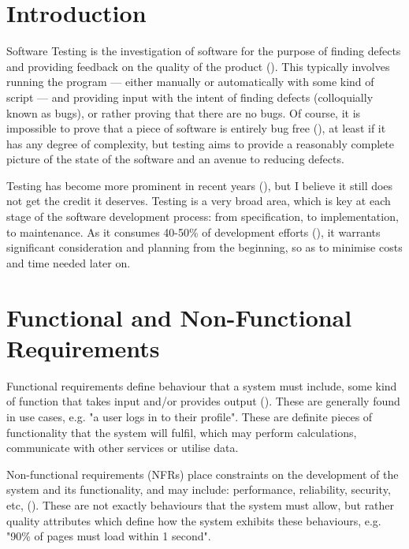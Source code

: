 \documentclass[12pt]{article}
\begin{document}
\pagebreak


\tableofcontents
\pagebreak



\section{Introduction}

Software Testing is the investigation of software for the purpose of finding defects and providing feedback on the quality of the product (). This typically involves running the program --- either manually or automatically with some kind of script --- and providing input with the intent of finding defects (colloquially known as bugs), or rather proving that there are no bugs. Of course, it is impossible to prove that a piece of software is entirely bug free (), at least if it has any degree of complexity, but testing aims to provide a reasonably complete picture of the state of the software and an avenue to reducing defects.

Testing has become more prominent in recent years (), but I believe it still does not get the credit it deserves. Testing is a very broad area, which is key at each stage of the software development process: from specification, to implementation, to maintenance. As it consumes 40-50\% of development efforts (), it warrants significant consideration and planning from the beginning, so as to minimise costs and time needed later on.



\section{Functional and Non-Functional Requirements} \label{reqs}

Functional requirements define behaviour that a system must include, some kind of function that takes input and/or provides output (). These are generally found in use cases, e.g. "a user logs in to their profile". These are definite pieces of functionality that the system will fulfil, which may perform calculations, communicate with other services or utilise data.

Non-functional requirements (NFRs) place constraints on the development of the system and its functionality, and may include: performance, reliability, security, etc, (). These are not exactly behaviours that the system must allow, but rather quality attributes which define how the system exhibits these behaviours, e.g. "90\% of pages must load within 1 second".
\end{document}
